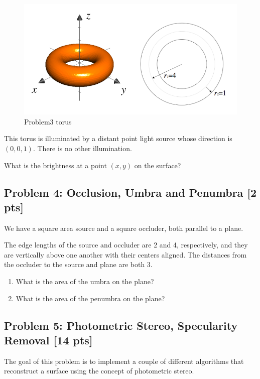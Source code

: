 \documentclass[11pt]{article}
\makeatletter
\def\maxwidth{\ifdim\Gin@nat@width>\linewidth\linewidth
    \else\Gin@nat@width\fi}
\let\Oldincludegraphics\includegraphics
\renewcommand{\includegraphics}[1]{\Oldincludegraphics[width=.8\maxwidth]{#1}}
\makeatother
\begin{document}
\begin{figure}
\centering
\includegraphics{Problem3 torus.png}
\caption{Problem3 torus}
\end{figure}

This torus is illuminated by a distant point light source whose
direction is \((0,0,1)\). There is no other illumination.

What is the brightness at a point \((x, y)\) on the surface?

    \subsection{Problem 4: Occlusion, Umbra and Penumbra {[}2
pts{]}}\label{problem-4-occlusion-umbra-and-penumbra-2-pts}

We have a square area source and a square occluder, both parallel to a
plane.

The edge lengths of the source and occluder are 2 and 4, respectively,
and they are vertically above one another with their centers aligned.
The distances from the occluder to the source and plane are both 3.

\begin{enumerate}
\def\labelenumi{\arabic{enumi}.}
\item
  What is the area of the umbra on the plane?
\item
  What is the area of the penumbra on the plane?
\end{enumerate}

    \subsection{Problem 5: Photometric Stereo, Specularity Removal {[}14
pts{]}}\label{problem-5-photometric-stereo-specularity-removal-14-pts}

The goal of this problem is to implement a couple of different
algorithms that reconstruct a surface using the concept of photometric
stereo.
\end{document}
